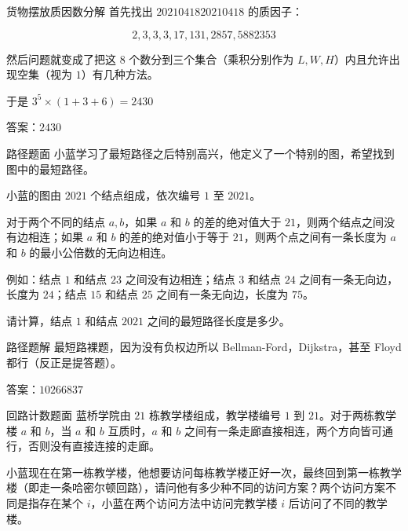 \documentclass{pptt}
\begin{document}
\begin{frame}{货物摆放}{质因数分解}
    首先找出 $2021041820210418$ 的质因子：

    $$2,3,3,3,17,131,2857,5882353$$

    然后问题就变成了把这 $8$ 个数分到三个集合（乘积分别作为 $L,W,H$）内且允许出现空集（视为 $1$）有几种方法。

    于是 $3^5 \times (1+3+6) = 2430$

    答案：$2430$
\end{frame}

\begin{frame}{路径}{题面}
    小蓝学习了最短路径之后特别高兴，他定义了一个特别的图，希望找到图中的最短路径。

    小蓝的图由 $2021$ 个结点组成，依次编号 $1$ 至 $2021$。

    对于两个不同的结点 $a,b$，如果 $a$ 和 $b$ 的差的绝对值大于 $21$，则两个结点之间没有边相连；如果 $a$ 和 $b$ 的差的绝对值小于等于 $21$，则两个点之间有一条长度为 $a$ 和 $b$ 的最小公倍数的无向边相连。

    例如：结点 $1$ 和结点 $23$ 之间没有边相连；结点 $3$ 和结点 $24$ 之间有一条无向边，长度为 $24$；结点 $15$ 和结点 $25$ 之间有一条无向边，长度为 $75$。

    请计算，结点 $1$ 和结点 $2021$ 之间的最短路径长度是多少。
\end{frame}

\begin{frame}{路径}{题解}
    最短路裸题，因为没有负权边所以 Bellman-Ford，Dijkstra，甚至 Floyd 都行（反正是提答题）。

    答案：$10266837$
\end{frame}

\begin{frame}{回路计数}{题面}
    蓝桥学院由 $21$ 栋教学楼组成，教学楼编号 $1$ 到 $21$。对于两栋教学楼 $a$ 和 $b$，当 $a$ 和 $b$ 互质时，$a$ 和 $b$ 之间有一条走廊直接相连，两个方向皆可通行，否则没有直接连接的走廊。

    小蓝现在在第一栋教学楼，他想要访问每栋教学楼正好一次，最终回到第一栋教学楼（即走一条哈密尔顿回路），请问他有多少种不同的访问方案？两个访问方案不同是指存在某个 $i$，小蓝在两个访问方法中访问完教学楼 $i$ 后访问了不同的教学楼。
\end{frame}
\end{document}
